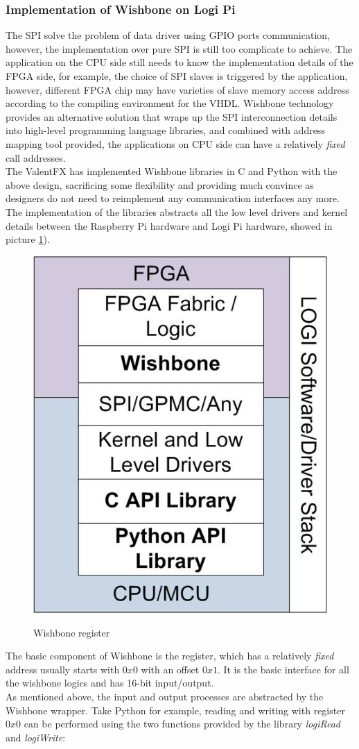 \documentclass[11pt,openright,a4paper]{report}
\begin{document}
\subsubsection{Implementation of Wishbone on Logi Pi}
The SPI solve the problem of data driver using GPIO ports communication, however, the implementation over pure SPI is still too complicate to achieve. The application on the CPU side still needs to know the implementation details of the FPGA side, for example, the choice of SPI slaves is triggered by the application, however, different FPGA chip may have varieties of slave memory access address according to the compiling environment for the VHDL. Wishbone technology provides an alternative solution that wraps up the SPI interconnection details into high-level programming language libraries, and combined with address mapping tool provided, the applications on CPU side can have a relatively \textit{fixed} call addresses.\\
The ValentFX has implemented Wishbone libraries in C and Python\cite{wishbone} with the above design, sacrificing some flexibility and providing much convince as designers do not need to reimplement any communication interfaces any more. The implementation of the libraries abstracts all the low level drivers and kernel details between the Raspberry Pi hardware and Logi Pi hardware, showed in picture \ref{fig:LOGIstack-software-drivers}).\\
\begin{figure}[H]
	\centering
	\includegraphics[width=0.2\linewidth]{"picture/LOGI stack - software - drivers"}
	\caption{Wishbone register}\cite{logipimanual}
	\label{fig:LOGIstack-software-drivers}
\end{figure}
The basic component of Wishbone is the register, which has a relatively \textit{fixed} address usually starts with $0x0$ with an offset $0x1$. It is the basic interface for all the wishbone logics and has 16-bit input/output\cite{logiwishbone}.\\
As mentioned above, the input and output processes are abstracted by the Wishbone wrapper. Take Python for example, reading and writing with register $0x0$ can be performed using the two functions provided by the library \textit{logiRead} and \textit{logiWrite}:
\end{document}
